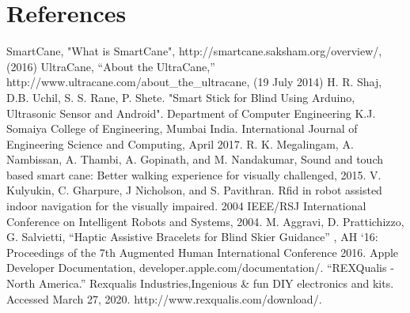 \documentclass[letterpaper,12pt]{article}
\begin{document}
\section{References}
\begin{thebibliography}{9}
 SmartCane, "What is SmartCane", http://smartcane.saksham.org/overview/, (2016)
 UltraCane, “About the UltraCane,” http://www.ultracane.com/about\_the\_ultracane, (19 July 2014)
 H. R. Shaj, D.B. Uchil, S. S. Rane, P. Shete. "Smart Stick for Blind Using Arduino, Ultrasonic Sensor and Android". Department of Computer Engineering K.J. Somaiya College of Engineering, Mumbai India. International Journal of Engineering Science and Computing, April 2017. 
 R. K. Megalingam, A. Nambissan, A. Thambi, A. Gopinath, and M. Nandakumar, Sound and touch based smart cane: Better walking experience for visually challenged, 2015.
 V. Kulyukin, C. Gharpure, J Nicholson, and S. Pavithran. Rfid in robot assisted indoor navigation for the visually impaired. 2004 IEEE/RSJ International Conference on Intelligent Robots and Systems, 2004.
 M. Aggravi, D. Prattichizzo, G. Salvietti, “Haptic Assistive Bracelets for Blind Skier
Guidance” , AH ‘16: Proceedings of the 7th Augmented Human International Conference 2016.
 Apple Developer Documentation, developer.apple.com/documentation/.
“REXQualis - North America.” Rexqualis Industries,Ingenious \& fun DIY electronics and kits. Accessed March 27, 2020. http://www.rexqualis.com/download/.

\end{thebibliography}



\end{document}
